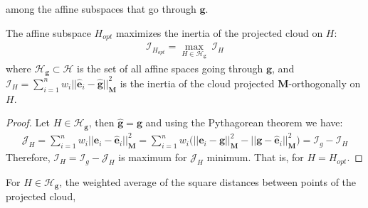 \begin{notechapter}
among the affine subspaces that go through $\textbf{g}$.
%
%
\begin{prop}
   The affine subspace $H_{opt}$ maximizes the inertia of the projected cloud on $H$:\\[6pt]
   \begin{align*}
        \mathcal{I}_{H_{opt}} = \underset{H \in \mathcal{H}_{\textbf{g}}}{\max}\ \mathcal{I}_{H}
   \end{align*}
   where $\mathcal{H}_{\textbf{g}} \subset \mathcal{H}$ is the set of all affine spaces going through $\textbf{g}$, and 
   $ \mathcal{I}_{H} = 
   \displaystyle\sum_{i=1}^{n} w_{i} \big| \big| {\hat{\textbf{e}}_i - \hat{\textbf{g}} \big| \big|}_{\mathbf{M}}^2$
   is the inertia of the cloud projected $\textbf{M}$-orthogonally on $H$.
\end{prop}
\begin{proof}
Let $H \in \mathcal{H}_{\textbf{g}}$, then $\hat{\textbf{g}} = \textbf{g}$ and using the Pythagorean theorem we have:
\begin{align*}
    \mathcal{J}_{H} = \displaystyle\sum_{i=1}^{n} w_{i} {\big| \big| \textbf{e}_i - \hat{\textbf{e}}_i \big| \big|}_{\mathbf{M}}^2
    = 
    \displaystyle\sum_{i=1}^{n} w_{i} 
    \big( {\big| \big| \textbf{e}_i - \textbf{g} \big| \big|}_{\mathbf{M}}^2 - 
    {\big| \big| \textbf{g} - \hat{\textbf{e}}_i \big| \big|}_{\mathbf{M}}^2 \big)
    =
    \mathcal{I}_{g} - \mathcal{I}_{H}
\end{align*}
Therefore, $\mathcal{I}_{H} = \mathcal{I}_{g} - \mathcal{J}_{H}$ is maximum for $\mathcal{J}_{H}$ minimum. That is, for $H = H_{opt}$.
\end{proof}
%
\begin{prop}
    For $H \in \mathcal{H}_{\textbf{g}}$, the weighted average of the square distances between points of the projected cloud,

\end{prop}
\end{notechapter}
